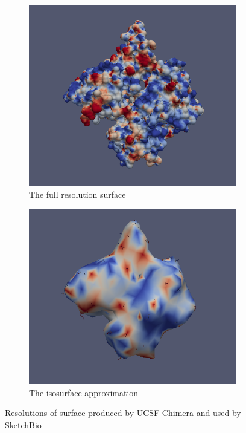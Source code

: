 \documentclass{article} %
\begin{document}
\begin{figure}[h]
	\centering
	\begin{subfigure}[b]{0.4\textwidth}
		\includegraphics[width=\textwidth]{fullResolution.png}
		\caption{The full resolution surface}
		\label{fig:fullResolution}
	\end{subfigure}
	\begin{subfigure}[b]{0.4\textwidth}
		\includegraphics[width=\textwidth]{isosurface.png}
		\caption{The isosurface approximation}
		\label{fig:isosurface}
	\end{subfigure}
	\caption{Resolutions of surface produced by UCSF Chimera and used by SketchBio}
	\label{fig:resolutions}
\end{figure}
\end{document}
